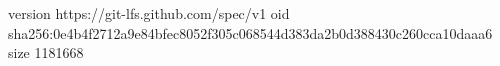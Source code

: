 version https://git-lfs.github.com/spec/v1
oid sha256:0e4b4f2712a9e84bfec8052f305c068544d383da2b0d388430c260cca10daaa6
size 1181668
